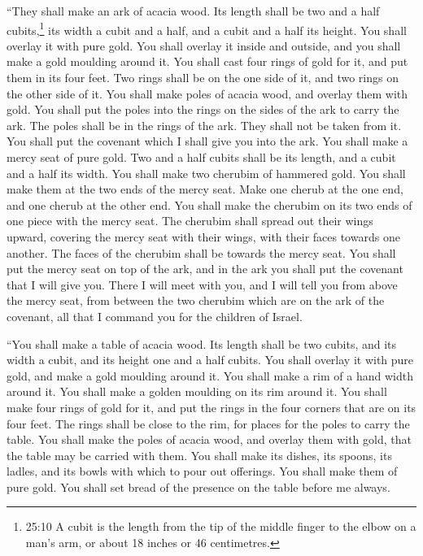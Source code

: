  ``They shall make an ark of acacia wood. Its length shall
be two and a half cubits,\footnote{25:10 A cubit is the length from the
  tip of the middle finger to the elbow on a man's arm, or about 18
  inches or 46 centimetres.} its width a cubit and a half, and a cubit
and a half its height.  You shall overlay it with pure
gold. You shall overlay it inside and outside, and you shall make a gold
moulding around it.  You shall cast four rings of gold for
it, and put them in its four feet. Two rings shall be on the one side of
it, and two rings on the other side of it.  You shall make
poles of acacia wood, and overlay them with gold.  You
shall put the poles into the rings on the sides of the ark to carry the
ark.  The poles shall be in the rings of the ark. They
shall not be taken from it.  You shall put the covenant
which I shall give you into the ark.  You shall make a
mercy seat of pure gold. Two and a half cubits shall be its length, and
a cubit and a half its width.  You shall make two cherubim
of hammered gold. You shall make them at the two ends of the mercy seat.
 Make one cherub at the one end, and one cherub at the
other end. You shall make the cherubim on its two ends of one piece with
the mercy seat.  The cherubim shall spread out their wings
upward, covering the mercy seat with their wings, with their faces
towards one another. The faces of the cherubim shall be towards the
mercy seat.  You shall put the mercy seat on top of the
ark, and in the ark you shall put the covenant that I will give you.
 There I will meet with you, and I will tell you from above
the mercy seat, from between the two cherubim which are on the ark of
the covenant, all that I command you for the children of Israel.

 ``You shall make a table of acacia wood. Its length shall
be two cubits, and its width a cubit, and its height one and a half
cubits.  You shall overlay it with pure gold, and make a
gold moulding around it.  You shall make a rim of a hand
width around it. You shall make a golden moulding on its rim around it.
 You shall make four rings of gold for it, and put the
rings in the four corners that are on its four feet.  The
rings shall be close to the rim, for places for the poles to carry the
table.  You shall make the poles of acacia wood, and
overlay them with gold, that the table may be carried with them.
 You shall make its dishes, its spoons, its ladles, and its
bowls with which to pour out offerings. You shall make them of pure
gold.  You shall set bread of the presence on the table
before me always.

